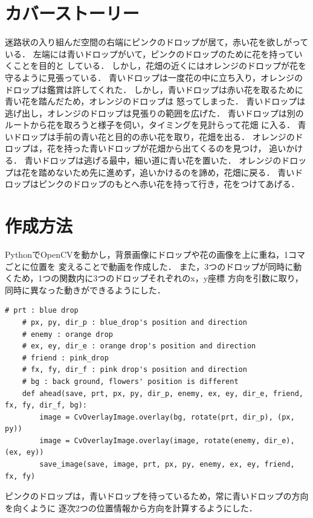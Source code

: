 \documentclass[a4]{jsarticle}
\title{}
\author{開放環境科学専攻 82119176 冨田寿子}
\date{}
\begin{document}
\maketitle

\section{カバーストーリー}
迷路状の入り組んだ空間の右端にピンクのドロップが居て，赤い花を欲しがっている．
左端には青いドロップがいて，ピンクのドロップのために花を持っていくことを目的と
している．
しかし，花畑の近くにはオレンジのドロップが花を守るように見張っている．
青いドロップは一度花の中に立ち入り，オレンジのドロップは鑑賞は許してくれた．
しかし，青いドロップは赤い花を取るために青い花を踏んだため，オレンジのドロップは
怒ってしまった．
青いドロップは逃げ出し，オレンジのドロップは見張りの範囲を広げた．
青いドロップは別のルートから花を取ろうと様子を伺い，タイミングを見計らって花畑
に入る．
青いドロップは手前の青い花と目的の赤い花を取り，花畑を出る．
オレンジのドロップは，花を持った青いドロップが花畑から出てくるのを見つけ，
追いかける．
青いドロップは逃げる最中，細い道に青い花を置いた．
オレンジのドロップは花を踏めないため先に進めず，追いかけるのを諦め，花畑に戻る．
青いドロップはピンクのドロップのもとへ赤い花を持って行き，花をつけてあげる．

\section{作成方法}
PythonでOpenCVを動かし，背景画像にドロップや花の画像を上に重ね，1コマごとに位置を
変えることで動画を作成した．
また，3つのドロップが同時に動くため，1つの関数内に3つのドロップそれぞれのx，y座標
方向を引数に取り，同時に異なった動きができるようにした．
\begin{lstlisting}[caption=3つのドロップの位置]
	# prt : blue drop
	# px, py, dir_p : blue_drop's position and direction
	# enemy : orange drop
	# ex, ey, dir_e : orange drop's position and direction
	# friend : pink_drop
	# fx, fy, dir_f : pink drop's position and direction
	# bg : back ground, flowers' position is different
	def ahead(save, prt, px, py, dir_p, enemy, ex, ey, dir_e, friend, fx, fy, dir_f, bg):
		image = CvOverlayImage.overlay(bg, rotate(prt, dir_p), (px, py))
		image = CvOverlayImage.overlay(image, rotate(enemy, dir_e), (ex, ey))
		save_image(save, image, prt, px, py, enemy, ex, ey, friend, fx, fy)
\end{lstlisting}
ピンクのドロップは，青いドロップを待っているため，常に青いドロップの方向を向くように
逐次2つの位置情報から方向を計算するようにした．
\end{document}
